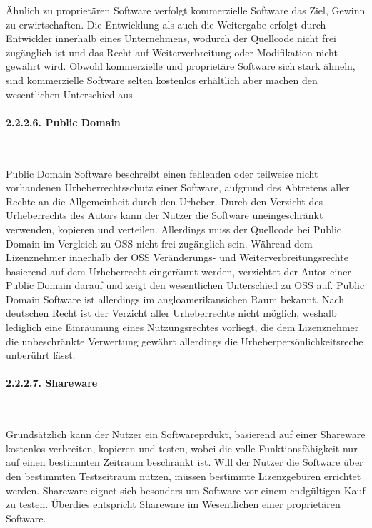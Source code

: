 Ähnlich zu proprietären Software verfolgt kommerzielle Software das Ziel, Gewinn zu erwirtschaften. \cite[S. 14]{bitkom_ev_open_2016} Die Entwicklung als auch die Weitergabe erfolgt durch Entwickler innerhalb eines Unternehmens, wodurch der Quellcode nicht frei zugänglich ist und das Recht auf Weiterverbreitung oder Modifikation nicht gewährt wird. Obwohl kommerzielle und proprietäre Software sich stark ähneln, sind kommerzielle Software selten kostenlos erhältlich aber machen den wesentlichen Unterschied aus. \cite[S. 4]{wichmann_linux-_2005}

\paragraph{2.2.2.6. Public Domain}$~$

Public Domain Software beschreibt einen fehlenden oder teilweise nicht vorhandenen Urheberrechtsschutz einer Software, aufgrund des Abtretens aller Rechte an die Allgemeinheit durch den Urheber. \cite[S. 14]{renner_open_2006} Durch den Verzicht des Urheberrechts des Autors kann der Nutzer die Software uneingeschränkt verwenden, kopieren und verteilen. Allerdings muss der Quellcode bei Public Domain im Vergleich zu OSS nicht frei zugänglich sein. \cite[S. 14]{renner_open_2006}  Während dem Lizenznehmer innerhalb der OSS Veränderungs- und Weiterverbreitungsrechte basierend auf dem Urheberrecht eingeräumt werden, verzichtet der Autor einer Public Domain darauf und zeigt den wesentlichen Unterschied zu OSS auf. \cite[S. 10]{wilmer_rechtliche_2021} Public Domain Software ist allerdings im angloamerikansichen Raum bekannt. Nach deutschen Recht ist der Verzicht aller Urheberrechte nicht möglich, weshalb lediglich eine Einräumung eines Nutzungsrechtes vorliegt, die dem Lizenznehmer die unbeschränkte Verwertung gewährt allerdings die Urheberpersönlichkeitsreche unberührt lässt. \cite[S. 14]{renner_open_2006}

\paragraph{2.2.2.7. Shareware}$~$

Grundsätzlich kann der Nutzer ein Softwareprdukt, basierend auf einer Shareware kostenlos verbreiten, kopieren und testen, wobei die volle Funktionsfähigkeit nur auf einen bestimmten Zeitraum beschränkt ist. \cite[S. 27]{groll_1x1_2021} Will der Nutzer die Software über den bestimmten Testzeitraum nutzen, müssen bestimmte Lizenzgebüren errichtet werden. Shareware eignet sich besonders um Software vor einem endgültigen Kauf zu testen. \cite[S. 14/15]{renner_open_2006} Überdies entspricht Shareware im Wesentlichen einer proprietären Software.

